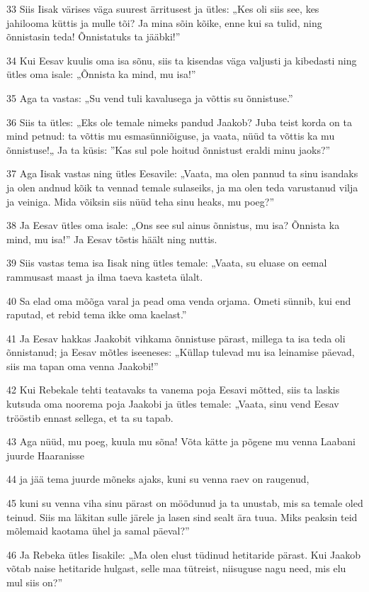 \par 33 Siis Iisak värises väga suurest ärritusest ja ütles: „Kes oli siis see, kes jahilooma küttis ja mulle tõi? Ja mina sõin kõike, enne kui sa tulid, ning õnnistasin teda! Õnnistatuks ta jääbki!”
\par 34 Kui Eesav kuulis oma isa sõnu, siis ta kisendas väga valjusti ja kibedasti ning ütles oma isale: „Õnnista ka mind, mu isa!”
\par 35 Aga ta vastas: „Su vend tuli kavalusega ja võttis su õnnistuse.”
\par 36 Siis ta ütles: „Eks ole temale nimeks pandud Jaakob? Juba teist korda on ta mind petnud: ta võttis mu esmasünniõiguse, ja vaata, nüüd ta võttis ka mu õnnistuse!„ Ja ta küsis: ”Kas sul pole hoitud õnnistust eraldi minu jaoks?”
\par 37 Aga Iisak vastas ning ütles Eesavile: „Vaata, ma olen pannud ta sinu isandaks ja olen andnud kõik ta vennad temale sulaseiks, ja ma olen teda varustanud vilja ja veiniga. Mida võiksin siis nüüd teha sinu heaks, mu poeg?”
\par 38 Ja Eesav ütles oma isale: „Ons see sul ainus õnnistus, mu isa? Õnnista ka mind, mu isa!” Ja Eesav tõstis häält ning nuttis.
\par 39 Siis vastas tema isa Iisak ning ütles temale: „Vaata, su eluase on eemal rammusast maast ja ilma taeva kasteta ülalt.
\par 40 Sa elad oma mõõga varal ja pead oma venda orjama. Ometi sünnib, kui end raputad, et rebid tema ikke oma kaelast.”
\par 41 Ja Eesav hakkas Jaakobit vihkama õnnistuse pärast, millega ta isa teda oli õnnistanud; ja Eesav mõtles iseeneses: „Küllap tulevad mu isa leinamise päevad, siis ma tapan oma venna Jaakobi!”
\par 42 Kui Rebekale tehti teatavaks ta vanema poja Eesavi mõtted, siis ta laskis kutsuda oma noorema poja Jaakobi ja ütles temale: „Vaata, sinu vend Eesav trööstib ennast sellega, et ta su tapab.
\par 43 Aga nüüd, mu poeg, kuula mu sõna! Võta kätte ja põgene mu venna Laabani juurde Haaranisse
\par 44 ja jää tema juurde mõneks ajaks, kuni su venna raev on raugenud,
\par 45 kuni su venna viha sinu pärast on möödunud ja ta unustab, mis sa temale oled teinud. Siis ma läkitan sulle järele ja lasen sind sealt ära tuua. Miks peaksin teid mõlemaid kaotama ühel ja samal päeval?”
\par 46 Ja Rebeka ütles Iisakile: „Ma olen elust tüdinud hetitaride pärast. Kui Jaakob võtab naise hetitaride hulgast, selle maa tütreist, niisuguse nagu need, mis elu mul siis on?”

